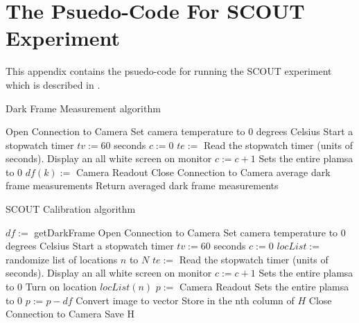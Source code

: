 \chapter{The Psuedo-Code For SCOUT Experiment}\label{app:scoutPsuedoCode}

This appendix contains the psuedo-code for running the SCOUT experiment which is described in .

\begin{algorithm}
	\caption{Dark Frame Measurement algorithm}
	\begin{algorithmic}[1]
		
		\State Open Connection to Camera
		\State Set camera temperature to $0$ degrees Celsius
		\State Start a stopwatch timer
		\State $tv := 60$ seconds
		\State $c := 0$
		 
			\Begin
			\State $te := $ Read the stopwatch timer (units of seconds).
				\Begin
					\State Display an all white screen on monitor
					\State $c := c + 1$
				\End
			\State Sets the entire plamsa to $0$
			\State $df(k) :=$ Camera Readout
			\End
		\State Close Connection to Camera
		\State average dark frame measurements 
		\State Return averaged dark frame measurements	
\end{algorithmic}
\end{algorithm}

\begin{algorithm}
	\caption{SCOUT Calibration algorithm}
	\begin{algorithmic}[1]
		\State $df := $ getDarkFrame  
		\State Open Connection to Camera
		\State Set camera temperature to $0$ degrees Celsius
		\State Start a stopwatch timer
		\State $tv := 60$ seconds
		\State $c := 0$
		\State $locList := $ randomize list of locations $n$ to $N$ 
			\Begin
			\State $te := $ Read the stopwatch timer (units of seconds).
				\Begin
					\State Display an all white screen on monitor
					\State $c := c + 1$
				\End
			\State Sets the entire plamsa to $0$
			\State Turn on location $locList(n)$
			\State $p :=$ Camera Readout
			\State Sets the entire plamsa to $0$
			\State $p := p - df$ 
			\State Convert image to vector
			\State Store in the nth column of $H$
			\End
		\State Close Connection to Camera
		\State Save H	
\end{algorithmic}
\end{algorithm}



